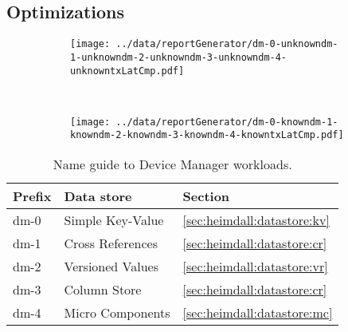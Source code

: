 \subsection{Optimizations}
\begin{figure}
  \centering
  \begin{subfigure}[b]{0.5\textwidth}
                \centering
                \texttt{[image: ../data/reportGenerator/dm-0-unknowndm-1-unknowndm-2-unknowndm-3-unknowndm-4-unknowntxLatCmp.pdf]}
                \caption{}
                \label{fig:}
        \end{subfigure}%
        ~
        \begin{subfigure}[b]{0.5\textwidth}
                \centering
                \texttt{[image: ../data/reportGenerator/dm-0-knowndm-1-knowndm-2-knowndm-3-knowndm-4-knowntxLatCmp.pdf]}
                \caption{}
                \label{}
        \end{subfigure}
        \caption[Device Manager performance analysis]{}
        \label{fig:dm:performance}
\end{figure}

\begin{table}
\small
\begin{tabular}{lll} 
    Prefix &  Data store & Section\\\toprule
    dm-0 & Simple Key-Value  & \ref{sec:heimdall:datastore:kv}  \\
    dm-1 & Cross References  & \ref{sec:heimdall:datastore:cr} \\
    dm-2 & Versioned Values & \ref{sec:heimdall:datastore:vr} \\
    dm-3 & Column Store & \ref{sec:heimdall:datastore:cr} \\
    dm-4 & Micro Components & \ref{sec:heimdall:datastore:mc} \\ 
  \end{tabular}
  \caption[Name guide to Device Manager workloads]{Name guide to
    Device Manager workloads.}
  \label{table:names:dm}
\end{table}

